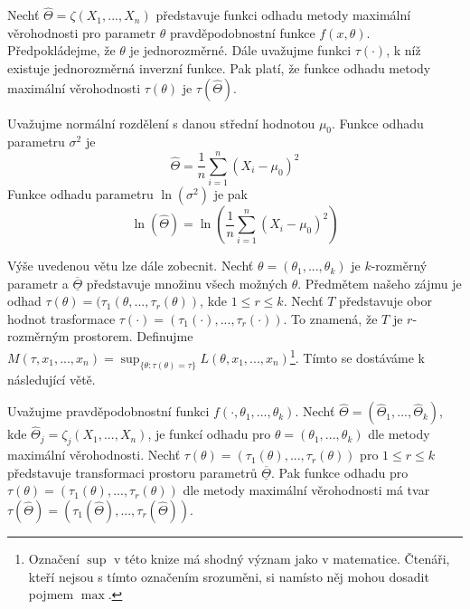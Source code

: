 \begin{theorem}
Nechť $\hat{\Theta} = \zeta(X_1, ..., X_n)$ představuje funkci odhadu metody maximální věrohodnosti pro parametr $\theta$ pravděpodobnostní funkce $f(x, \theta)$. Předpokládejme, že $\theta$ je jednorozměrné. Dále uvažujme funkci $\tau(\cdot)$, k níž existuje jednorozměrná inverzní funkce. Pak platí, že funkce odhadu metody maximální věrohodnosti $\tau(\theta)$ je $\tau(\hat{\Theta})$.
\end{theorem}

\begin{example}
Uvažujme normální rozdělení s danou střední hodnotou $\mu_0$. Funkce odhadu parametru $\sigma^2$ je
\begin{equation*}
\hat{\Theta} = \frac{1}{n}\sum_{i = 1}^n (X_i - \mu_0)^2
\end{equation*}
Funkce odhadu parametru $\ln(\sigma^2)$ je pak
\begin{equation*}
\ln(\hat{\Theta}) = \ln\left(\frac{1}{n} \sum_{i = 1}^n (X_i - \mu_0)^2 \right)
\end{equation*}
\end{example}

Výše uvedenou větu lze dále zobecnit. Nechť $\theta = (\theta_1, ..., \theta_k)$ je $k$-rozměrný parametr a $\overline{\underline{\Theta}}$ představuje množinu všech možných $\theta$. Předmětem našeho zájmu je  odhad $\tau(\theta) = (\tau_1(\theta, ..., \tau_r(\theta))$, kde $1 \le r \le k$. Nechť $T$ představuje obor hodnot trasformace $\tau(\cdot) = (\tau_1(\cdot), ..., \tau_r(\cdot))$. To znamená, že $T$ je $r$-rozměrným prostorem. Definujme $M(\tau, x_1, ..., x_n) = \sup_{\{\theta: \tau(\theta) = \tau\}}L(\theta, x_1, ..., x_n)$\footnote{Označení $\sup$ v této knize má shodný význam jako v matematice. Čtenáři, kteří nejsou s tímto označením srozuměni, si namísto něj mohou dosadit pojmem $\max$.}. Tímto se dostáváme k následující větě.

\begin{theorem}
Uvažujme pravděpodobnostní funkci $f(\cdot, \theta_1, ..., \theta_k)$. Nechť $\hat{\Theta} = (\hat{\Theta}_1, ..., \hat{\Theta}_k)$, kde $\hat{\Theta}_j = \zeta_j(X_1, ..., X_n)$, je funkcí odhadu pro $\theta = (\theta_1, ..., \theta_k)$ dle metody maximální věrohodnosti. Nechť $\tau(\theta) = (\tau_1(\theta), ..., \tau_r(\theta))$ pro $1 \le r \le k$ představuje transformaci prostoru parametrů $\overline{\underline{\Theta}}$. Pak funkce odhadu pro $\tau(\theta) = (\tau_1(\theta), ..., \tau_r(\theta))$ dle metody maximální věrohodnosti má tvar $\tau(\hat{\Theta}) = (\tau_1(\hat{\Theta}), ..., \tau_r(\hat{\Theta}))$.
\end{theorem}

